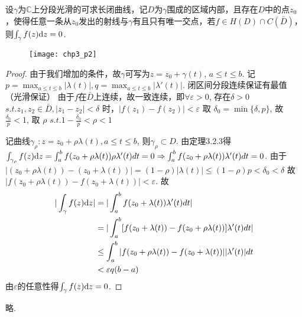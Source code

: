 \addtocounter{theorem}{-1}
\begin{theorem}[*]
	设$\gamma$为$\mathbb{C}$上分段光滑的可求长闭曲线，记$D$为$\gamma$围成的区域内部，且存在$D$中的点$z_0$，使得任意一条从$z_0$发出的射线与$\gamma$有且只有唯一交点，若$f \in H(D) \cap C(\bar{D})$，则$\int_\gamma f(z) \mathrm{d}z = 0$.
\end{theorem}

\begin{figure}[h]
	\centering
	\texttt{[image: chp3\_p2]}
\end{figure}

\begin{proof}
	由于我们增加的条件，故$\gamma$可写为$z = z_0 + \gamma(t)$, $a \leq t \leq b$.
	记$p = \max_{a \leq t \leq b} \vert \lambda (t) \vert, q = \max_{a \leq t \leq b} \vert \lambda'(t) \vert$. 闭区间分段连续保证有最值（光滑保证）
	由于$f$在$\bar{D}$上连续，故一致连续，即$\forall \varepsilon > 0$, 存在$\delta > 0$ $s.t. z_1, z_2 \in \bar{D}, \vert z_1 - z_2 \vert < \delta$ 时，$\vert f(z_1) - f(z_2) \vert < \varepsilon$
	取 $\delta_0 = \min \{ \delta, p \}$, 故$\frac{\delta_0}{p} <1 $, 取 $\rho$ $ s.t. 1 - \frac{\delta_0}{p} < \rho < 1$
	
	记曲线$\gamma_\rho: z = z_0 + \rho \lambda(t), a \leq t \leq b$, 则$\gamma_\rho \subset D$. 由定理3.2.3得 $\int_{\gamma_\rho} f(z)\mathrm{d}z = \int_a^b f(z_0 + \rho \lambda(t)) \rho \lambda'(t) dt = 0 \Rightarrow \int_a^b f(z_0 + \rho \lambda(t)) \lambda'(t) dt = 0$.
	由于$\vert (z_0 + \rho \lambda(t)) - (z_0 + \lambda(t)) \vert = (1 - \rho) \vert \lambda(t) \vert \leq (1-\rho) p < \delta_0 < \delta$
	故$\vert f(z_0 + \rho \lambda(t)) - f(z_0 + \lambda(t)) \vert < \varepsilon$.
	故
	\begin{align*}
	\vert \int_\gamma f(z) \mathrm{d}z \vert &= \vert \int_a ^b f(z_0 + \lambda(t)) \lambda'(t) dt \vert \\
	&= \vert \int_a^b [f(z_0 + \lambda(t)) - f(z_0 + \rho \lambda(t))] \lambda'(t) dt \vert\\
	&\leq \int_a^b \vert f(z_0 + \rho \lambda(t)) - f(z_0 + \lambda(t)) \vert \vert \lambda'(t) \vert dt\\
	&< \varepsilon q(b-a)
	\end{align*}
	由$\varepsilon$的任意性得$\int_\gamma f(z) \mathrm{d}z = 0$.
	
\end{proof}




\begin{theorem}  略.
\end{theorem}


